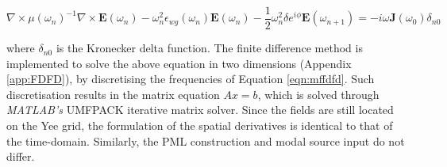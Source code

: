\begin{equation}
\nabla \times \mu(\omega_n)^{-1} \nabla \times \bm{E}(\omega_n) - \omega_n^2 \epsilon_{wg}(\omega_n) \bm{E}(\omega_n) - \dfrac{1}{2} \omega_n^2 \delta e^{i \phi} \bm{E}(\omega_{n+1}) = -i \omega \bm{J}(\omega_0) \delta_{n0}
\label{eqn:mffdfd}
\end{equation}

where $\delta_{n0}$ is the Kronecker delta function. The finite difference method is implemented to solve the above equation in two dimensions (Appendix \ref{app:FDFD}), by discretising the frequencies of Equation \ref{eqn:mffdfd}. Such discretisation results in the matrix equation $Ax=b$, which is solved through \textit{MATLAB's} UMFPACK iterative matrix solver. Since the fields are still located on the Yee grid, the formulation of the spatial derivatives is identical to that of the time-domain. Similarly, the PML construction and modal source input do not differ. 




